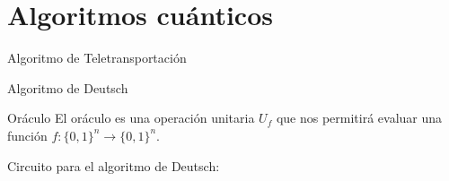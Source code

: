 \documentclass[10pt,compress]{beamer}
\begin{document}
\section{Algoritmos cuánticos}

\begin{frame}{Algoritmo de Teletransportación}
\begin{center}
\end{center}
\end{frame}

\begin{frame}{Algoritmo de Deutsch}
\begin{block}{Oráculo}
El oráculo es una operación unitaria $U_f$ que nos permitirá evaluar una función $f:\{0,1\}^n \longrightarrow \{0,1\}^n$.
\begin{center}
\end{center}
\end{block}
\pause
Circuito para el algoritmo de Deutsch:
\begin{center}
\end{center}

\end{frame}
\end{document}

